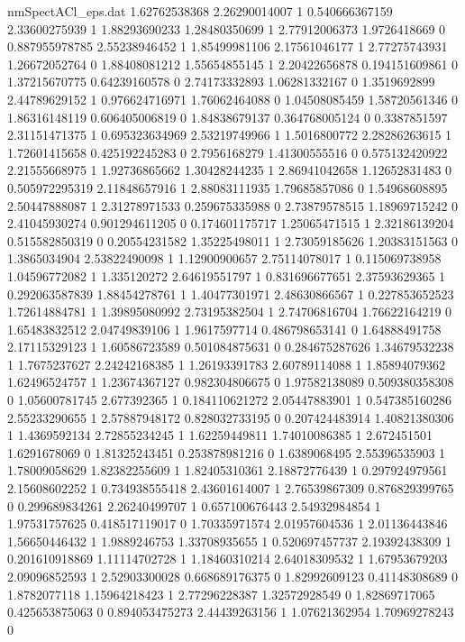 \begin{filecontents}{nmSpectACl_eps.dat}
1.62762538368 2.26290014007 1
0.540666367159 2.33600275939 1
1.88293690233 1.28480350699 1
2.77912006373 1.9726418669 0
0.887955978785 2.55238946452 1
1.85499981106 2.17561046177 1
2.77275743931 1.26672052764 0
1.88408081212 1.55654855145 1
2.20422656878 0.194151609861 0
1.37215670775 0.64239160578 0
2.74173332893 1.06281332167 0
1.3519692899 2.44789629152 1
0.976624716971 1.76062464088 0
1.04508085459 1.58720561346 0
1.86316148119 0.606405006819 0
1.84838679137 0.364768005124 0
0.3387851597 2.31151471375 1
0.695323634969 2.53219749966 1
1.5016800772 2.28286263615 1
1.72601415658 0.425192245283 0
2.7956168279 1.41300555516 0
0.575132420922 2.21555668975 1
1.92736865662 1.30428244235 1
2.86941042658 1.12652831483 0
0.505972295319 2.11848657916 1
2.88083111935 1.79685857086 0
1.54968608895 2.50447888087 1
2.31278971533 0.259675335988 0
2.73879578515 1.18969715242 0
2.41045930274 0.901294611205 0
0.174601175717 1.25065471515 1
2.32186139204 0.515582850319 0
0.20554231582 1.35225498011 1
2.73059185626 1.20383151563 0
1.3865034904 2.53822490098 1
1.12900900657 2.75114078017 1
0.115069738958 1.04596772082 1
1.335120272 2.64619551797 1
0.831696677651 2.37593629365 1
0.292063587839 1.88454278761 1
1.40477301971 2.48630866567 1
0.227853652523 1.72614884781 1
1.39895080992 2.73195382504 1
2.74706816704 1.76622164219 0
1.65483832512 2.04749839106 1
1.9617597714 0.486798653141 0
1.64888491758 2.17115329123 1
1.60586723589 0.501084875631 0
0.284675287626 1.34679532238 1
1.7675237627 2.24242168385 1
1.26193391783 2.60789114088 1
1.85894079362 1.62496524757 1
1.23674367127 0.982304806675 0
1.97582138089 0.509380358308 0
1.05600781745 2.677392365 1
0.184110621272 2.05447883901 1
0.547385160286 2.55233290655 1
2.57887948172 0.828032733195 0
0.207424483914 1.40821380306 1
1.4369592134 2.72855234245 1
1.62259449811 1.74010086385 1
2.672451501 1.6291678069 0
1.81325243451 0.253878981216 0
1.6389068495 2.55396535903 1
1.78009058629 1.82382255609 1
1.82405310361 2.18872776439 1
0.297924979561 2.15608602252 1
0.734938555418 2.43601614007 1
2.76539867309 0.876829399765 0
0.299689834261 2.26240499707 1
0.657100676443 2.54932984854 1
1.97531757625 0.418517119017 0
1.70335971574 2.01957604536 1
2.01136443846 1.56650446432 1
1.9889246753 1.33708935655 1
0.520697457737 2.19392438309 1
0.201610918869 1.11114702728 1
1.18460310214 2.64018309532 1
1.67953679203 2.09096852593 1
2.52903300028 0.668689176375 0
1.82992609123 0.41148308689 0
1.8782077118 1.15964218423 1
2.77296228387 1.32572928549 0
1.82869717065 0.425653875063 0
0.894053475273 2.44439263156 1
1.07621362954 1.70969278243 0

\end{filecontents}
